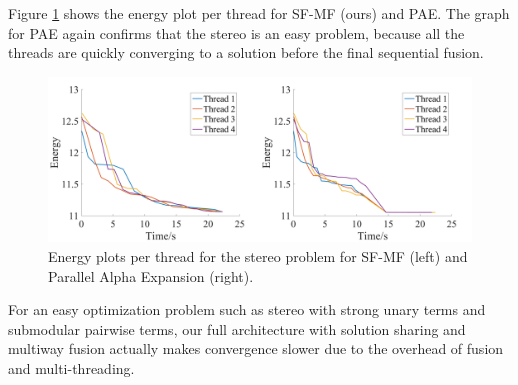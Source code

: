 %
%
%
Figure \ref{fig:stereo_threads} shows the energy plot per thread
for SF-MF (ours) and PAE. The graph for PAE again confirms that the
stereo is an easy problem, because all the threads are quickly
converging to a solution before the final sequential fusion.
\begin{figure}[tb]
  \includegraphics[width=\columnwidth]{figure/stereo_threads.png}
  \caption{
 Energy plots per thread for the stereo problem for SF-MF (left) and
 Parallel Alpha Expansion (right).
} \label{fig:stereo_threads}
\end{figure}

For an easy optimization problem such as stereo with strong unary terms
and submodular pairwise terms, our full architecture with solution
sharing and multiway fusion actually makes convergence slower due to the
overhead of fusion and multi-threading.









